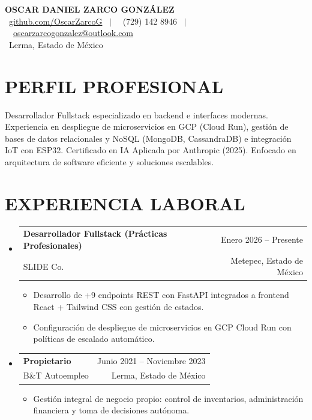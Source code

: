 \documentclass[letterpaper,11pt]{article}
\makeatletter
\newcommand{\resumeSubheading}[4]{
  \vspace{-1pt}\item
    \begin{tabular*}{0.97\textwidth}[t]{l@{\extracolsep{\fill}}r}
      \textbf{#1} & \small #2 \\
      \small#3 & \small #4 \\
    \end{tabular*}\vspace{-6pt}
}
\newcommand{\resumeItemListStart}{\begin{itemize}[leftmargin=0.15in, label={$\circ$}]}
\newcommand{\resumeItemListEnd}{\end{itemize}\vspace{-3pt}}
\makeatother
\begin{document}
\begin{center}
    \textbf{\Huge OSCAR DANIEL ZARCO GONZÁLEZ} \\ \vspace{1pt}
    \small 
    \faGithub \ \href{https://github.com/OscarZarcoG/}{github.com/OscarZarcoG} \ $|$ \ 
    \faPhone \ (729) 142 8946 \ $|$ \ 
    \faEnvelope \ \href{mailto:oscarzarcogonzalez@outlook.com}{oscarzarcogonzalez@outlook.com} \\
    \faMapMarker \ Lerma, Estado de México
\end{center}

\vspace{-5pt}

\section{PERFIL PROFESIONAL}
\small Desarrollador Fullstack especializado en backend e interfaces modernas. Experiencia en despliegue de microservicios en GCP (Cloud Run), gestión de bases de datos relacionales y NoSQL (MongoDB, CassandraDB) e integración IoT con ESP32. Certificado en IA Aplicada por Anthropic (2025). Enfocado en arquitectura de software eficiente y soluciones escalables.

\section{EXPERIENCIA LABORAL}
  \begin{itemize}[leftmargin=0.15in, label={}]
    \resumeSubheading
      {Desarrollador Fullstack (Prácticas Profesionales)}{Enero 2026 -- Presente}
      {SLIDE Co.}{Metepec, Estado de México}
      \resumeItemListStart
        \item Desarrollo de +9 endpoints REST con FastAPI integrados a frontend React + Tailwind CSS con gestión de estados.
        \item Configuración de despliegue de microservicios en GCP Cloud Run con políticas de escalado automático.
      \resumeItemListEnd

    \resumeSubheading
      {Propietario}{Junio 2021 -- Noviembre 2023}
      {B\&T Autoempleo}{Lerma, Estado de México}
      \resumeItemListStart
        \item Gestión integral de negocio propio: control de inventarios, administración financiera y toma de decisiones autónoma.
      \resumeItemListEnd
  \end{itemize}

\vspace{-5pt}
\end{document}
